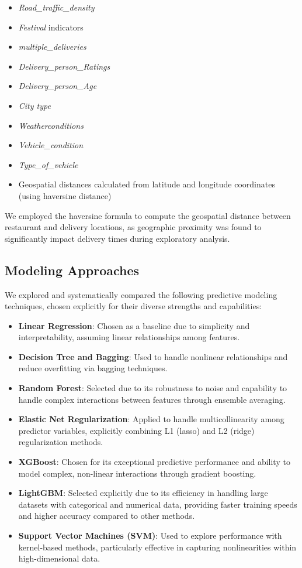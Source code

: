 \documentclass[10pt,twocolumn,letterpaper]{article}
\begin{document}
\begin{itemize}
    \item \textit{Road\_traffic\_density}
    \item \textit{Festival} indicators
    \item \textit{multiple\_deliveries}
    \item \textit{Delivery\_person\_Ratings}
    \item \textit{Delivery\_person\_Age}
    \item \textit{City type}
    \item \textit{Weatherconditions}
    \item \textit{Vehicle\_condition}
    \item \textit{Type\_of\_vehicle}
    \item Geospatial distances calculated from latitude and longitude coordinates (using haversine distance)
\end{itemize}

We employed the haversine formula to compute the geospatial distance between restaurant and delivery locations, as geographic proximity was found to significantly impact delivery times during exploratory analysis.

\subsection{Modeling Approaches}
We explored and systematically compared the following predictive modeling techniques, chosen explicitly for their diverse strengths and capabilities:

\begin{itemize}
    \item \textbf{Linear Regression}: Chosen as a baseline due to simplicity and interpretability, assuming linear relationships among features.
    \item \textbf{Decision Tree and Bagging}: Used to handle nonlinear relationships and reduce overfitting via bagging techniques.
    \item \textbf{Random Forest}: Selected due to its robustness to noise and capability to handle complex interactions between features through ensemble averaging.
    \item \textbf{Elastic Net Regularization}: Applied to handle multicollinearity among predictor variables, explicitly combining L1 (lasso) and L2 (ridge) regularization methods.
    \item \textbf{XGBoost}: Chosen for its exceptional predictive performance and ability to model complex, non-linear interactions through gradient boosting.
    \item \textbf{LightGBM}: Selected explicitly due to its efficiency in handling large datasets with categorical and numerical data, providing faster training speeds and higher accuracy compared to other methods.
    \item \textbf{Support Vector Machines (SVM)}: Used to explore performance with kernel-based methods, particularly effective in capturing nonlinearities within high-dimensional data.
\end{itemize}
\end{document}
